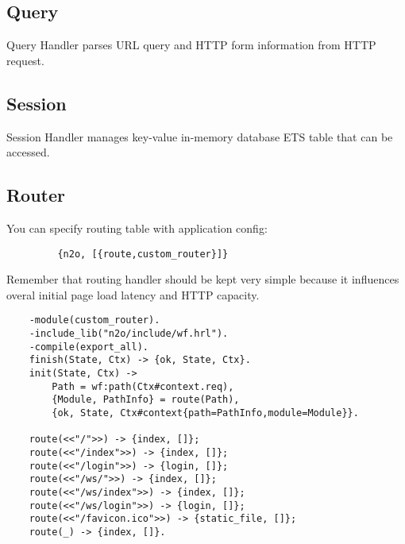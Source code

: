 \subsection{Query}
Query Handler parses URL query and HTTP form information from HTTP request.

\subsection{Session}
Session Handler manages key-value in-memory database ETS table that can be accessed.

\newpage
\subsection{Router}
You can specify routing table with application config:

\vspace{1\baselineskip}
\begin{lstlisting}
         {n2o, [{route,custom_router}]}
\end{lstlisting}
\vspace{1\baselineskip}

Remember that routing handler should be kept very simple because it
influences overal initial page load latency and HTTP capacity.

\vspace{1\baselineskip}
\begin{lstlisting}
    -module(custom_router).
    -include_lib("n2o/include/wf.hrl").
    -compile(export_all).
    finish(State, Ctx) -> {ok, State, Ctx}.
    init(State, Ctx) -> 
        Path = wf:path(Ctx#context.req),
        {Module, PathInfo} = route(Path),
        {ok, State, Ctx#context{path=PathInfo,module=Module}}.

    route(<<"/">>) -> {index, []};
    route(<<"/index">>) -> {index, []};
    route(<<"/login">>) -> {login, []};
    route(<<"/ws/">>) -> {index, []};
    route(<<"/ws/index">>) -> {index, []};
    route(<<"/ws/login">>) -> {login, []};
    route(<<"/favicon.ico">>) -> {static_file, []};
    route(_) -> {index, []}.
\end{lstlisting}
